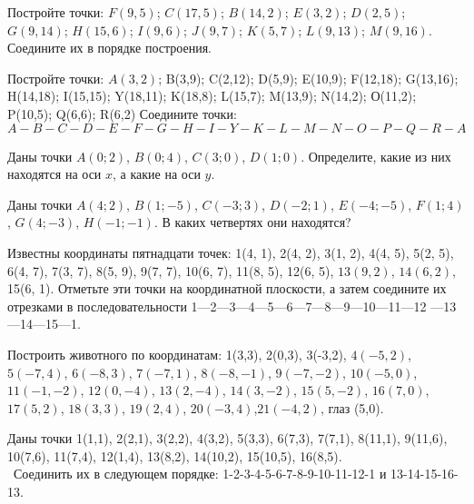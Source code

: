 \begin{class}[number=5]
	\begin{listofex}
		\item Постройте точки:
		\( F(9,5) \); \( C(17,5) \); \( B(14,2) \); \( E(3,2) \); \( D(2,5) \);
		\( G(9,14) \); \( H(15,6) \); \( I(9,6) \); \( J(9,7) \); \( K(5,7) \); \( L(9,13) \); \(  M(9,16) \). Соедините их в порядке построения.
		\item Постройте точки:
		 \( A(3,2) \); B(3,9); C(2,12); D(5,9); E(10,9);
		F(12,18); G(13,16); H(14,18); I(15,15);
		Y(18,11); K(18,8); L(15,7); M(13,9);
		N(14,2); О(11,2); P(10,5); Q(6,6); R(6,2) 
		Соедините точки:
		\( A-B-C-D-E-F-G-H-I-Y-K-L-M-N-O-P-
		Q-R-A \)
		\item Даны точки \( A (0;2) \), \( B (0;4) \), \( C (3;0) \), \( D (1;0) \). Определите, какие из них находятся на оси \( x \), а какие на оси \( y \).
		\item Даны точки \( A(4;2) \), \( B(1;-5) \), \( C(-3;3) \), \( D(-2;1) \), \( E(-4;-5) \), \( F(1;4) \), \( G(4;-3) \), \( H(-1;-1) \). В каких четвертях они находятся?
		\item Известны координаты пятнадцати точек: 1(4, 1), 2(4, 2), 3(1, 2), 4(4, 5), 5(2, 5), 6(4, 7), 7(3, 7), 8(5, 9), 9(7, 7), 10(6, 7), 11(8, 5), 12(6, 5), \( 13(9, 2) \), \( 14(6, 2) \), 15(6, 1). Отметьте эти точки на координатной плоскости, а затем соедините их отрезками в последовательности 1—2—3—4—5—6—7—8—9—10—11—12 —13—14—15—1. 
		\item Построить животного по координатам:
		1(3,3), 2(0,3), 3(-3,2), \( 4(-5,2) \), \(  5(-7,4) \), \( 6(-8,3) \), \( 7(-7,1) \), \( 8(-8,-1) \), \( 9(-7,-2) \), \( 10(-5,0) \), \( 11(-1,-2) \), \( 12(0,-4) \), \( 13(2,-4) \), \( 14(3,-2) \), \( 15(5,-2) \), \( 16(7,0) \), \( 17(5,2) \), \( 18(3,3) \), \( 19(2,4) \), \( 20(-3,4) \),\(  21(-4,2) \), глаз (5,0).
		\item Даны точки 1(1,1), 2(2,1), 3(2,2), 4(3,2), 5(3,3), 6(7,3), 7(7,1), 8(11,1), 9(11,6), 10(7,6), 11(7,4), 12(1,4), 13(8,2), 14(10,2), 15(10,5), 16(8,5).\\\
		Соединить их в следующем порядке:
		1-2-3-4-5-6-7-8-9-10-11-12-1 и 13-14-15-16-13.
	\end{listofex}
\end{class}

